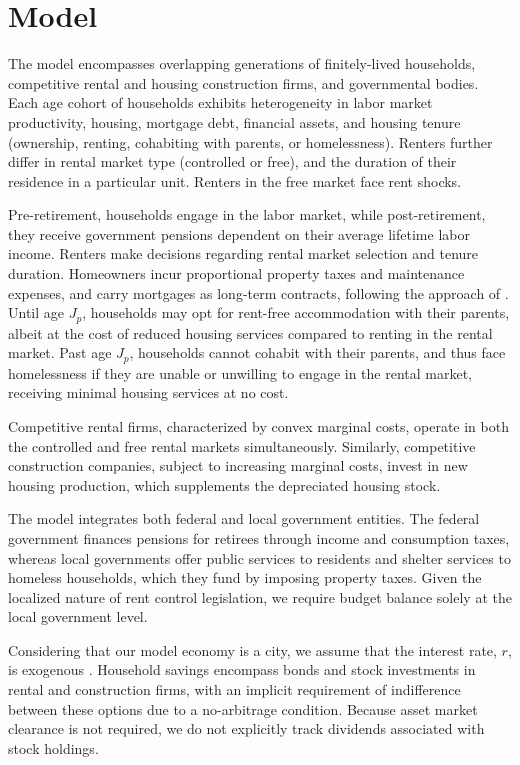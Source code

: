 \documentclass[parskip=full]{article}
\begin{document}
\section{Model}\label{sec:model}

The model encompasses overlapping generations of finitely-lived households, competitive rental and housing construction firms, and governmental bodies. Each age cohort of households exhibits heterogeneity in labor market productivity, housing, mortgage debt, financial assets, and housing tenure (ownership, renting, cohabiting with parents, or homelessness). Renters further differ in rental market type (controlled or free), and the duration of their residence in a particular unit. Renters in the free market face rent shocks.

Pre-retirement, households engage in the labor market, while post-retirement, they receive government pensions dependent on their average lifetime labor income. Renters make decisions regarding rental market selection and tenure duration. Homeowners incur proportional property taxes and maintenance expenses, and carry mortgages as long-term contracts, following the approach of \citet{kkk-2021}. Until age $J_{p}$, households may opt for rent-free accommodation with their parents, albeit at the cost of reduced housing services compared to renting in the rental market. Past age $J_{p}$, households cannot cohabit with their parents, and thus face homelessness if they are unable or unwilling to engage in the rental market, receiving minimal housing services at no cost.

Competitive rental firms, characterized by convex marginal costs, operate in both the controlled and free rental markets simultaneously. Similarly, competitive construction companies, subject to increasing marginal costs, invest in new housing production, which supplements the depreciated housing stock.

The model integrates both federal and local government entities. The federal government finances pensions for retirees through income and consumption taxes, whereas local governments offer public services to residents and shelter services to homeless households, which they fund by imposing property taxes. Given the localized nature of rent control legislation, we require budget balance solely at the local government level.

Considering that our model economy is a city, we assume that the interest rate, $r$, is exogenous \citep{sommeretal-2013, arslanetal-2015, sommersullivan-2017, kaplanetal-2019}. Household savings encompass bonds and stock investments in rental and construction firms, with an implicit requirement of indifference between these options due to a no-arbitrage condition. Because asset market clearance is not required, we do not explicitly track dividends associated with stock holdings. 
\end{document}
